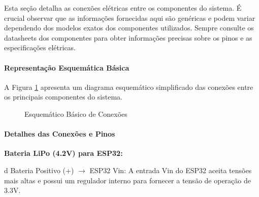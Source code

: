 
Esta seção detalha as conexões elétricas entre os componentes do sistema. É crucial observar que as informações fornecidas aqui são genéricas e podem variar dependendo dos modelos exatos dos componentes utilizados. Sempre consulte os datasheets dos componentes para obter informações precisas sobre os pinos e as especificações elétricas.

\paragraph{Representação Esquemática Básica}

A Figura \ref{fig:esquematico_basico} apresenta um diagrama esquemático simplificado das conexões entre os principais componentes do sistema.

\begin{figure}[H]
    \centering
    \caption{Esquemático Básico de Conexões}
    \label{fig:esquematico_basico}
\end{figure}

\paragraph{Detalhes das Conexões e Pinos}

%

 \textbf{Bateria LiPo (4.2V) para ESP32:}

d
Bateria Positivo (+) $\rightarrow$ ESP32 Vin: A entrada Vin do ESP32 aceita tensões mais altas e possui um regulador interno para fornecer a tensão de operação de 3.3V.

